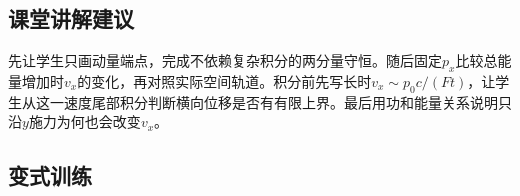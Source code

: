 \documentclass[UTF8,fontset=fandol,a4paper,11pt]{ctexart}
\begin{document}

\subsection*{课堂讲解建议}

先让学生只画动量端点，完成不依赖复杂积分的两分量守恒。随后固定$p_x$比较总能量增加时$v_x$的变化，再对照实际空间轨道。积分前先写长时$v_x\sim p_0c/(Ft)$，让学生从这一速度尾部积分判断横向位移是否有有限上界。最后用功和能量关系说明只沿$y$施力为何也会改变$v_x$。



\subsection*{变式训练}
\end{document}
